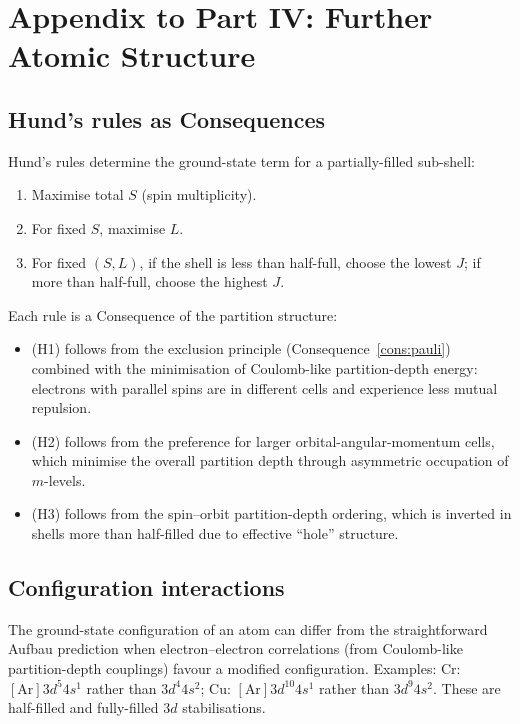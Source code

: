 \documentclass[11pt,twocolumn,a4paper]{article}
\theoremstyle{axiomstyle}
\theoremstyle{conseqstyle}
\theoremstyle{definition}
\theoremstyle{remark}
\begin{document}
\section*{Appendix to Part IV: Further Atomic Structure}

\subsection{Hund's rules as Consequences}

Hund's rules determine the ground-state term for a partially-filled sub-shell:
\begin{enumerate}[label=(H\arabic*)]
\item Maximise total $S$ (spin multiplicity).
\item For fixed $S$, maximise $L$.
\item For fixed $(S,L)$, if the shell is less than half-full, choose the lowest $J$; if more than half-full, choose the highest $J$.
\end{enumerate}
Each rule is a Consequence of the partition structure:
\begin{itemize}
\item (H1) follows from the exclusion principle (Consequence~\ref{cons:pauli}) combined with the minimisation of Coulomb-like partition-depth energy: electrons with parallel spins are in different cells and experience less mutual repulsion.
\item (H2) follows from the preference for larger orbital-angular-momentum cells, which minimise the overall partition depth through asymmetric occupation of $m$-levels.
\item (H3) follows from the spin--orbit partition-depth ordering, which is inverted in shells more than half-filled due to effective ``hole'' structure.
\end{itemize}

\subsection{Configuration interactions}

The ground-state configuration of an atom can differ from the straightforward Aufbau prediction when electron--electron correlations (from Coulomb-like partition-depth couplings) favour a modified configuration. Examples: Cr: $[\text{Ar}]3d^{5}4s^{1}$ rather than $3d^{4}4s^{2}$; Cu: $[\text{Ar}]3d^{10}4s^{1}$ rather than $3d^{9}4s^{2}$. These are half-filled and fully-filled $3d$ stabilisations.
\end{document}
